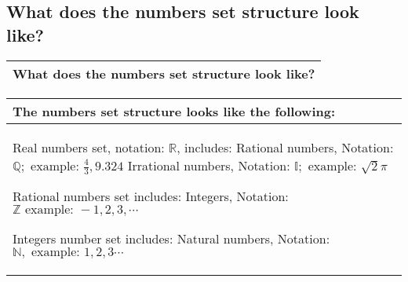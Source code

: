 \subsection{What does the numbers set structure look like?}
\begin{small}
    \begin{tabularx}{1\textwidth}{
            p{}
        }
        \toprule
        \textbf{What does the numbers set structure look like?}\\
        \bottomrule

    \end{tabularx}
\end{small}
\begin{small}
    \begin{tabularx}{1\textwidth}{
            p{}
        }
        \toprule
        \textbf{The numbers set  structure looks like the following:} \\
        \midrule

        \makecell{
            Real numbers set, notation: $\mathbb{R}$, includes:\\
            Rational numbers, Notation: $ \mathbb{Q}; \text{ example: } \frac{4}{3}, 9.324$\\
            Irrational numbers, Notation: $ \mathbb{I}; \text{ example: } \sqrt{2} \pi $\\
            \\ 
            Rational numbers set includes:\\
            Integers, Notation: $\mathbb{Z} \text{ example: } -1, 2, 3, \cdots $\\
            \\
            Integers number set includes:\\
            Natural numbers, Notation: $\mathbb{N}, \text{ example: } 1, 2, 3 \cdots$
        }
        \\
        \bottomrule

    \end{tabularx}
\end{small}
